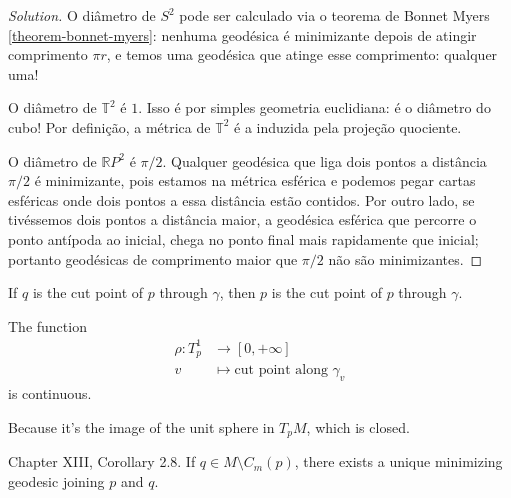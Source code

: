 \begin{proof}[Solution]
O diâmetro de $S^2$ pode ser calculado via o
teorema de Bonnet Myers
\ref{theorem-bonnet-myers}: nenhuma geodésica
é minimizante depois de atingir
comprimento $\pi r$, e temos uma geodésica
que atinge esse comprimento: qualquer
uma!

O diâmetro de $\mathbb{T}^2$ é $1$. Isso é
por simples geometria
euclidiana: é o diâmetro do cubo! Por
definição, a métrica de  $\mathbb{T}^2$ é
a induzida pela projeção quociente.

O diâmetro de $\mathbb{R}P^{2}$ é $\pi/2$.
Qualquer geodésica que liga dois
pontos a distância $\pi/2$ é minimizante,
pois estamos na métrica esférica e
podemos pegar cartas esféricas onde dois
pontos a essa distância estão contidos.
Por outro lado, se tivéssemos dois pontos a
distância maior, a geodésica
esférica que percorre o ponto antípoda ao
inicial, chega no ponto final mais
rapidamente que inicial; portanto geodésicas
de comprimento maior que $\pi/2$
não são minimizantes.
\end{proof}

\begin{lemma}
\label{lemma-cut-point-reflexive}
If $q$ is the cut point of $p$ through
$\gamma$, then $p$ is the cut point of
$p$ through $\gamma$.
\end{lemma}

\begin{lemma}
\label{lemma-not-cut-locus-minimizing}

\end{lemma}

\begin{proposition}
The function
$$
\begin{aligned}
	\rho: T^1_p &\longrightarrow [0,+\infty] \\
	v &\longmapsto \text{cut point along
	}\gamma_v
\end{aligned}
$$
is continuous.
\end{proposition}

\begin{lemma}
\label{lemma-cut-locus-closed}
Because it's the image of the unit sphere in
$T_pM$, which is closed.
\end{lemma}

\begin{lemma}
\label{lemma-cut-locus-topology}

\end{lemma}

\begin{lemma}
\label{lemma-outsi-cut-locus-exist-minim}
\cite{doc} Chapter XIII, Corollary 2.8. If $q
\in M\setminus C_m(p)$, there exists a
 unique minimizing geodesic joining
$p$ and $q$.
\end{lemma}

